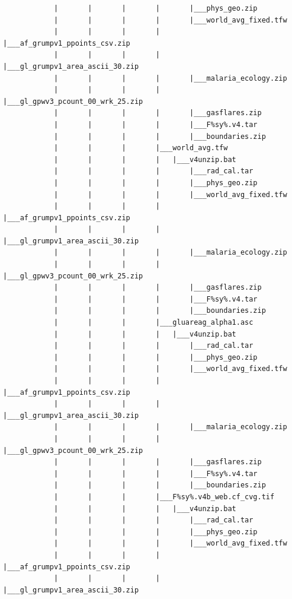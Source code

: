 \documentclass[
]{book}
\begin{document}
\begin{verbatim}
            |       |       |       |       |___phys_geo.zip
            |       |       |       |       |___world_avg_fixed.tfw
            |       |       |       |       |___af_grumpv1_ppoints_csv.zip
            |       |       |       |       |___gl_grumpv1_area_ascii_30.zip
            |       |       |       |       |___malaria_ecology.zip
            |       |       |       |       |___gl_gpwv3_pcount_00_wrk_25.zip
            |       |       |       |       |___gasflares.zip
            |       |       |       |       |___F%sy%.v4.tar
            |       |       |       |       |___boundaries.zip
            |       |       |       |___world_avg.tfw
            |       |       |       |   |___v4unzip.bat
            |       |       |       |       |___rad_cal.tar
            |       |       |       |       |___phys_geo.zip
            |       |       |       |       |___world_avg_fixed.tfw
            |       |       |       |       |___af_grumpv1_ppoints_csv.zip
            |       |       |       |       |___gl_grumpv1_area_ascii_30.zip
            |       |       |       |       |___malaria_ecology.zip
            |       |       |       |       |___gl_gpwv3_pcount_00_wrk_25.zip
            |       |       |       |       |___gasflares.zip
            |       |       |       |       |___F%sy%.v4.tar
            |       |       |       |       |___boundaries.zip
            |       |       |       |___gluareag_alpha1.asc
            |       |       |       |   |___v4unzip.bat
            |       |       |       |       |___rad_cal.tar
            |       |       |       |       |___phys_geo.zip
            |       |       |       |       |___world_avg_fixed.tfw
            |       |       |       |       |___af_grumpv1_ppoints_csv.zip
            |       |       |       |       |___gl_grumpv1_area_ascii_30.zip
            |       |       |       |       |___malaria_ecology.zip
            |       |       |       |       |___gl_gpwv3_pcount_00_wrk_25.zip
            |       |       |       |       |___gasflares.zip
            |       |       |       |       |___F%sy%.v4.tar
            |       |       |       |       |___boundaries.zip
            |       |       |       |___F%sy%.v4b_web.cf_cvg.tif
            |       |       |       |   |___v4unzip.bat
            |       |       |       |       |___rad_cal.tar
            |       |       |       |       |___phys_geo.zip
            |       |       |       |       |___world_avg_fixed.tfw
            |       |       |       |       |___af_grumpv1_ppoints_csv.zip
            |       |       |       |       |___gl_grumpv1_area_ascii_30.zip

\end{verbatim}
\end{document}

